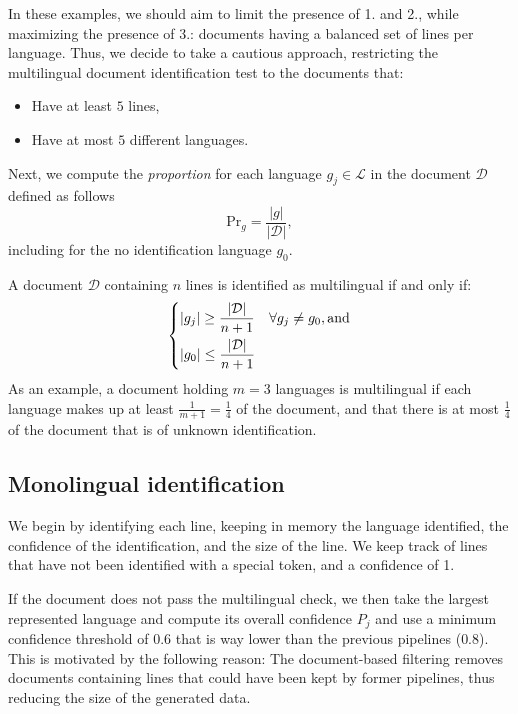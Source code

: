 In these examples, we should aim to limit the presence of 1. and 2., while maximizing the presence of 3.: documents having a balanced set of lines per language. Thus, we decide to take a cautious approach, restricting the multilingual document identification test to the documents that:
\begin{itemize}
    \item Have at least $5$ lines,
    \item Have at most $5$ different languages.
\end{itemize}
Next, we compute the \emph{proportion} for each language $g_j \in \mathscr{L}$ in the document $\mathcal{D}$ defined as follows
\[
    \mathrm{Pr}_g = \frac{|g|}{|\mathcal{D}|},
\]
including for the no identification language $g_0$.

A document $\mathcal{D}$ containing $n$ lines is identified as multilingual if and only if:
\[
    \begin{dcases}
        |g_j| \ge \frac{|\mathcal{D}|}{n+1} & \forall g_j \neq g_0, \text{and} \\
        |g_0| \le \frac{|\mathcal{D}|}{n+1}
    \end{dcases}
\]
As an example, a document holding $m=3$ languages is multilingual if each language makes up at least $\frac{1}{m+1} = \frac{1}{4}$ of the document, and that there is at most $\frac{1}{4}$ of the document that is of unknown identification.

\subsection{Monolingual identification}
We begin by identifying each line, keeping in memory the language identified, the confidence of the identification, and the size of the line. We keep track of lines that have not been identified with a special token, and a confidence of 1.

If the document does not pass the multilingual check, we then take the largest represented language and compute its overall confidence $P_j$ and use a minimum confidence threshold of $0.6$ that is way lower than the previous pipelines ($0.8$). This is motivated by the following reason: The document-based filtering removes documents containing lines that could have been kept by former pipelines, thus reducing the size of the generated data.

